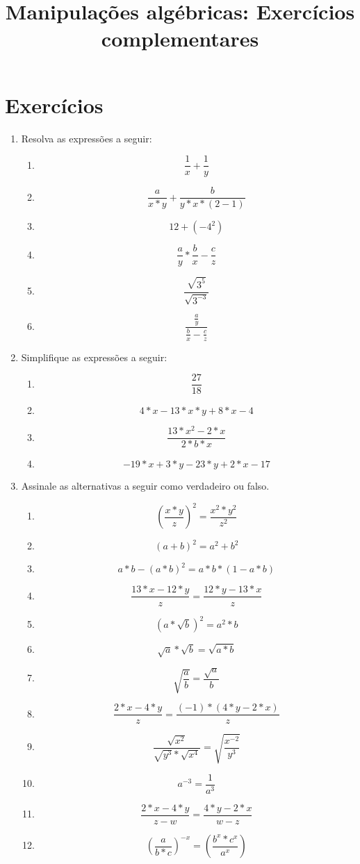 \documentclass[12pt]{article}
\begin{document}
\title{Manipulações algébricas: Exercícios complementares}
\date{}
\maketitle

\newpage

\section{Exercícios}
\begin{enumerate}
	\item Resolva as expressões a seguir:
	\begin{enumerate}
		\item $$\frac{1}{x}+\frac{1}{y}$$
		\item $$\frac{a}{x*y}+\frac{b}{y*x*(2-1)}$$
		\item $$12 + (-4^2)$$
		\item $$\frac{a}{y}*\frac{b}{x}-\frac{c}{z}$$
		\item $$\frac{\sqrt{3^5}}{\sqrt{3^{-3}}}$$
		\item $$\frac{\frac{a}{y}}{\frac{b}{x}-\frac{c}{z}}$$
	\end{enumerate}

	\item Simplifique as expressões a seguir:
	\begin{enumerate}
		\item $$\frac{27}{18}$$
		\item $$4*x - 13*x*y + 8*x - 4$$
		\item $$\frac{13*x^2 - 2*x}{2*b*x}$$
		\item $$-19*x + 3*y - 23*y + 2*x - 17$$
	\end{enumerate}

	\item Assinale as alternativas a seguir como verdadeiro ou falso.
	\begin{enumerate}
		\item $${\left(\frac{x*y}{z}\right)}^2 = \frac{x^2*y^2}{z^2}$$
		\item $${(a + b)}^2 = a^2 + b^2$$
		\item $$a*b - {(a*b)}^2 = a*b*(1 - a*b)$$
		\item $$\frac{13*x - 12*y}{z} = \frac{12*y - 13*x}{z}$$
		\item $${(a*\sqrt{b})}^2 = a^2*b$$
		\item $$\sqrt{a}*\sqrt{b} = \sqrt{a*b}$$
		\item $$\sqrt{\frac{a}{b}} = \frac{\sqrt{a}}{b}$$
		\item $$\frac{2*x - 4*y}{z} = \frac{(-1)*(4*y - 2*x)}{z}$$
		\item $$\frac{\sqrt{x^2}}{\sqrt{y^3}*\sqrt{x^4}} = 
			  \sqrt{\frac{x^{-2}}{y^3}}$$
		\item $$a^{-3} = \frac{1}{a^3}$$
		\item $$\frac{2*x - 4*y}{z - w} = \frac{4*y - 2*x}{w - z}$$
		\item $${\left(\frac{a}{b*c}\right)}^{-x} = 	
			  \left(\frac{b^x*c^x}{a^x}\right)$$
	\end{enumerate}
\end{enumerate}
\end{document}
